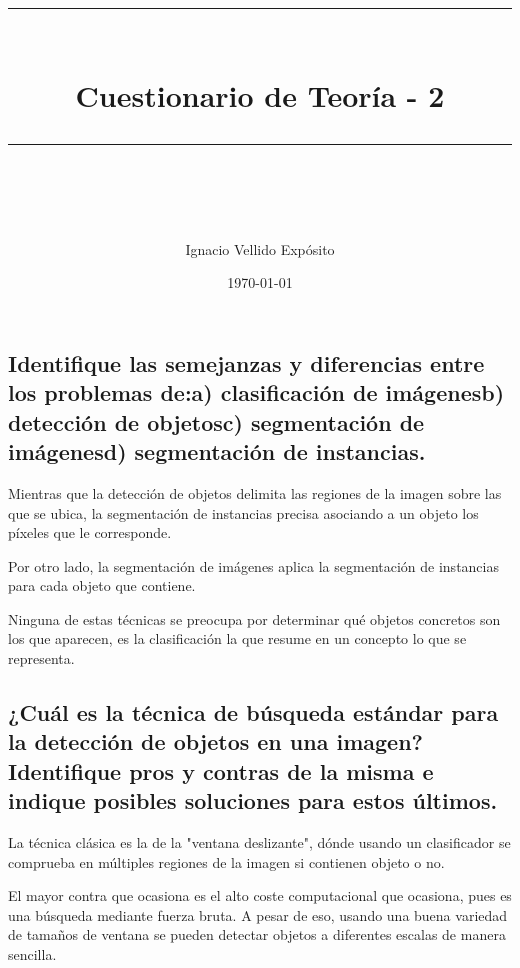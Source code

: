 \documentclass[11pt]{scrartcl} %
\title{	
	\normalfont\normalsize	
	\rule{\linewidth}{0.5pt}\\ %
	\vspace{20pt} %
	{\huge Cuestionario de Teoría - 2}\\ %
	\vspace{12pt} %
	\rule{\linewidth}{2pt}\\ %
	\vspace{12pt} %
}
\author{\LARGE Ignacio Vellido Expósito} %
\date{\normalsize\today} %
\begin{document}
\maketitle %

\subsection{Identifique las semejanzas y diferencias entre los problemas
de:\newline a) clasificación de imágenes\newline b) detección de objetos\newline c)
segmentación de imágenes\newline d) segmentación de instancias.}


Mientras que la detección de objetos delimita las regiones de la imagen sobre 
las que se ubica, la segmentación de instancias precisa asociando a un objeto los
píxeles que le corresponde. \newline

Por otro lado, la segmentación de imágenes aplica la segmentación de instancias para cada 
objeto que contiene.\newline

Ninguna de estas técnicas se preocupa por determinar qué objetos concretos son 
los que aparecen, es la clasificación la que resume en un concepto lo que se 
representa.

\subsection{¿Cuál es la técnica de búsqueda estándar para la detección de
objetos en una imagen?\newline Identifique pros y contras de la misma e
indique posibles soluciones para estos últimos.}


La técnica clásica es la de la "ventana deslizante", dónde usando un clasificador
se comprueba en múltiples regiones de la imagen si contienen objeto o no. \newline

El mayor contra que ocasiona es el alto coste computacional que ocasiona, pues 
es una búsqueda mediante fuerza bruta.
A pesar de eso, usando una buena variedad de tamaños de ventana se pueden detectar
objetos a diferentes escalas de manera sencilla.

\newpage
\end{document}
